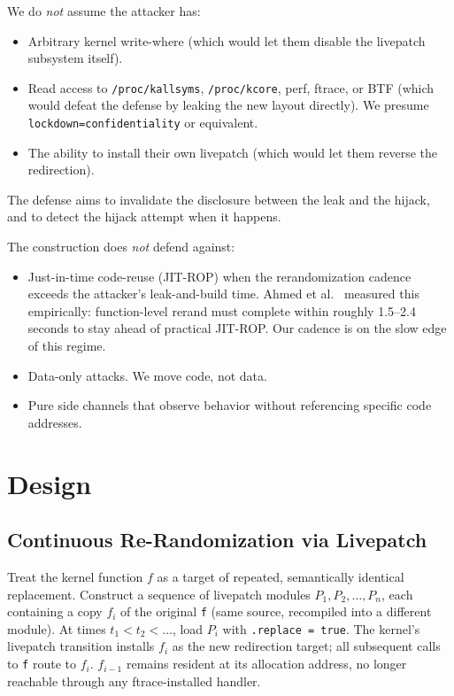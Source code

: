 \documentclass[10pt,letterpaper]{article}
\begin{document}
We do \emph{not} assume the attacker has:
\begin{itemize}[leftmargin=*]
\item Arbitrary kernel write-where (which would let them disable the
livepatch subsystem itself).
\item Read access to \texttt{/proc/kallsyms}, \texttt{/proc/kcore},
perf, ftrace, or BTF (which would defeat the defense by leaking the
new layout directly). We presume \texttt{lockdown=confidentiality}
or equivalent.
\item The ability to install their own livepatch (which would let
them reverse the redirection).
\end{itemize}

The defense aims to invalidate the disclosure between the leak and
the hijack, and to detect the hijack attempt when it happens.

The construction does \emph{not} defend against:
\begin{itemize}[leftmargin=*]
\item Just-in-time code-reuse (JIT-ROP) \cite{jit_rop,snow_zombie}
when the rerandomization cadence exceeds the attacker's leak-and-build
time. Ahmed et al.\ \cite{ahmed_rerand} measured this empirically:
function-level rerand must complete within roughly 1.5--2.4 seconds
to stay ahead of practical JIT-ROP. Our cadence is on the slow edge
of this regime.
\item Data-only attacks. We move code, not data.
\item Pure side channels that observe behavior without referencing
specific code addresses.
\end{itemize}

\section{Design}
\label{sec:design}

\subsection{Continuous Re-Randomization via Livepatch}

Treat the kernel function $f$ as a target of repeated, semantically
identical replacement. Construct a sequence of livepatch modules
$P_1, P_2, \ldots, P_n$, each containing a copy $f_i$ of the original
\texttt{f} (same source, recompiled into a different module). At
times $t_1 < t_2 < \ldots$, load $P_i$ with \texttt{.replace = true}.
The kernel's livepatch transition installs $f_i$ as the new
redirection target; all subsequent calls to \texttt{f} route to $f_i$.
$f_{i-1}$ remains resident at its allocation address, no longer
reachable through any ftrace-installed handler.
\end{document}
